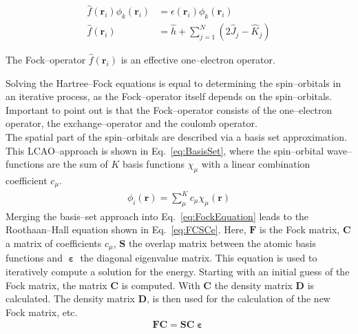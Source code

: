 \begin{align}
	\hat{f}(\textbf{r}_i) \phi_k(\textbf{r}_i) &= \epsilon(\textbf{r}_i) \phi_k(\textbf{r}_i)
	\label{eq:FockEquation}\\
	\hat{f}(\textbf{r}_i) &= \hat{h} + \sum_{j=1}^N (2 \hat{J}_j - \hat{K}_j)
\end{align}

The Fock--operator $\hat{f}(\textbf{r}_i)$ is an effective one--electron operator.

Solving the Hartree--Fock equations is equal to determining the spin--orbitals in an iterative process,
as the Fock--operator itself depends on the spin--orbitals.
Important to point out is that the Fock--operator consists of the one--electron operator, the exchange--operator
and the coulomb operator. \\
The spatial part of the spin--orbitals are described via a basis set approximation.
This LCAO--approach is shown in Eq.~\eqref{eq:BasisSet},
where the spin--orbital wave--functions are the sum of $K$ basis functions $\chi_\mu$ with a linear combination coefficient $c_\mu$.
\begin{align}
	\label{eq:BasisSet}
	\phi_i(\textbf{r}) = \sum_\mu^K c_\mu \chi_\mu (\textbf{r})
\end{align}
Merging the basis--set approach into Eq.~\eqref{eq:FockEquation} leads to the Roothaan--Hall equation shown in Eq.~\eqref{eq:FCSCe}.
Here, $\textbf{F}$ is the Fock matrix, $\textbf{C}$ a matrix of coefficients $c_\mu$,
$\textbf{S}$ the overlap matrix between the atomic basis functions and $\bm{\upepsilon}$ the diagonal eigenvalue matrix.
This equation is used to iteratively compute a solution for the energy.
Starting with an initial guess of the Fock matrix,
the matrix $\textbf{C}$ is computed. With $\textbf{C}$ the density matrix $\textbf{D}$ is calculated. 
The density matrix $\textbf{D}$, is then used for the calculation of the new Fock matrix, etc.
\begin{align}
	\label{eq:FCSCe}
	\textbf{F} \textbf{C} = \textbf{S} \textbf{C} \bm{\upepsilon}
\end{align}
\newpage

